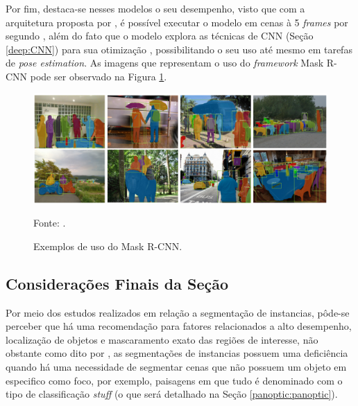 Por fim, destaca-se nesses modelos o seu desempenho, visto que com a arquitetura proposta por \cite{He2020}, é possível executar o modelo em cenas à 5 \textit{frames} por segundo \cite{Minaee2021, He2020, Hafiz2020}, além do fato que o modelo explora as técnicas de CNN (Seção \ref{deep:CNN}) para sua otimização \cite{Li2020AProspects}, possibilitando o seu uso até mesmo em tarefas de \textit{pose estimation}. As imagens que representam o uso do \textit{framework} Mask R-CNN pode ser observado na Figura \ref{instance:fig:3}.

\begin{figure}[H]
    \centering
    \caption{Exemplos de uso do Mask R-CNN.}
    \includegraphics[width=1\textwidth]{recursos/imagens/instance/insta_examp.png}
    \label{instance:fig:3}

    \vspace*{1 cm}
    Fonte: \cite{He2020}.
\end{figure}


\subsection{Considerações Finais da Seção}
\label{instance:conclusion}

Por meio dos estudos realizados em relação a segmentação de instancias, pôde-se perceber que há uma recomendação para fatores relacionados a alto desempenho, localização de objetos e mascaramento exato das regiões de interesse, não obstante como dito por \cite{Kirillov2019a}, as segmentações de instancias possuem uma deficiência quando há uma necessidade de segmentar cenas que não possuem um objeto em especifico como foco, por exemplo, paisagens em que tudo é denominado com o tipo de classificação \textit{stuff} (o que será detalhado na Seção \ref{panoptic:panoptic}).